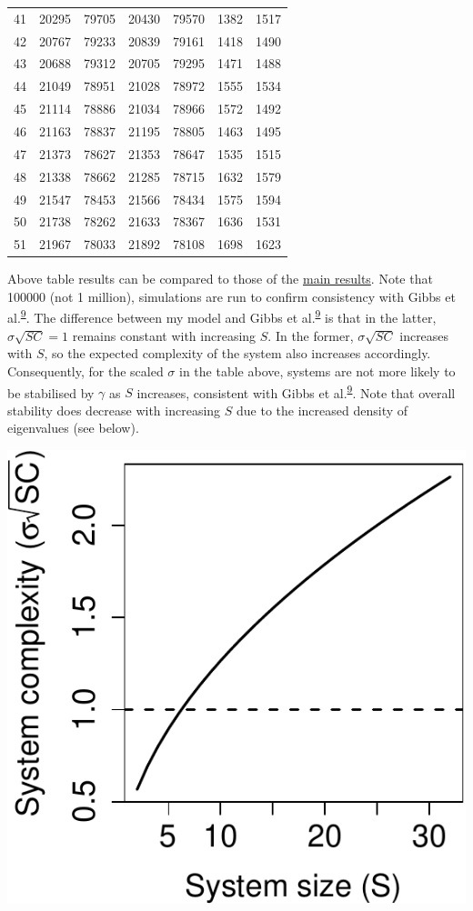 \documentclass[]{article}
\begin{document}
\begin{longtable}[]{@{}rrrrrrr@{}}
41 & 20295 & 79705 & 20430 & 79570 & 1382 & 1517\tabularnewline
42 & 20767 & 79233 & 20839 & 79161 & 1418 & 1490\tabularnewline
43 & 20688 & 79312 & 20705 & 79295 & 1471 & 1488\tabularnewline
44 & 21049 & 78951 & 21028 & 78972 & 1555 & 1534\tabularnewline
45 & 21114 & 78886 & 21034 & 78966 & 1572 & 1492\tabularnewline
46 & 21163 & 78837 & 21195 & 78805 & 1463 & 1495\tabularnewline
47 & 21373 & 78627 & 21353 & 78647 & 1535 & 1515\tabularnewline
48 & 21338 & 78662 & 21285 & 78715 & 1632 & 1579\tabularnewline
49 & 21547 & 78453 & 21566 & 78434 & 1575 & 1594\tabularnewline
50 & 21738 & 78262 & 21633 & 78367 & 1636 & 1531\tabularnewline
51 & 21967 & 78033 & 21892 & 78108 & 1698 & 1623\tabularnewline
\bottomrule
\end{longtable}

Above table results can be compared to those of the
\protect\hyperlink{IncrS}{main results}. Note that 100000 (not 1
million), simulations are run to confirm consistency with Gibbs et
al.\textsuperscript{\protect\hyperlink{ref-Gibbs2017}{9}}. The
difference between my model and Gibbs et
al.\textsuperscript{\protect\hyperlink{ref-Gibbs2017}{9}} is that in the
latter, \(\sigma\sqrt{SC} = 1\) remains constant with increasing \(S\).
In the former, \(\sigma\sqrt{SC}\) increases with \(S\), so the expected
complexity of the system also increases accordingly. Consequently, for
the scaled \(\sigma\) in the table above, systems are not more likely to
be stabilised by \(\gamma\) as \(S\) increases, consistent with Gibbs et
al.\textsuperscript{\protect\hyperlink{ref-Gibbs2017}{9}}. Note that
overall stability does decrease with increasing \(S\) due to the
increased density of eigenvalues (see below).

\begin{center}
\includegraphics{unnamed-chunk-34-1} 
\end{center}
\end{document}
